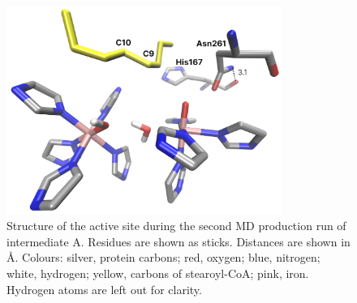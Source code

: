 \begin{figure}[htbp]
    \centering
    \includegraphics[width=0.8\textwidth]{Figures/int_A_run2.png}
    \caption{Structure of the active site during the second MD production run of intermediate A. Residues are shown as sticks. Distances are shown in Å. Colours: silver, protein carbons; red, oxygen; blue, nitrogen; white, hydrogen; yellow, carbons of stearoyl-CoA; pink, iron. Hydrogen atoms are left out for clarity.}
    \label{fig:intA_run2}
\end{figure}

